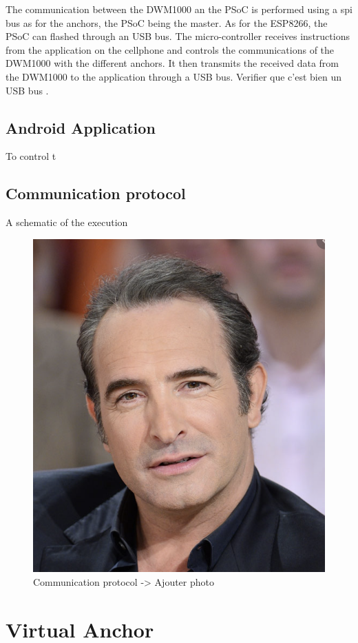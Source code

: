 The communication between the DWM1000 an the PSoC is performed using a \gls{spi} bus as for the anchors, the PSoC being the master. As for the ESP8266, the PSoC can flashed through an USB bus. The micro-controller receives instructions from the application on the cellphone and controls the communications of the DWM1000 with the different anchors. It then transmits the received data from the DWM1000 to the application through a USB bus. \color{red} Verifier que c'est bien un USB bus \color{black}.

\subsection{Android Application}

To control t



\subsection{Communication protocol}

A schematic of the execution 

\begin{figure}[H]
\centering
\includegraphics[width=.2\linewidth]{Images/Temporary_pic.png}
\caption{Communication protocol -> Ajouter photo}
\label{fig:com_prot}
\end{figure}



\section{Virtual Anchor}

